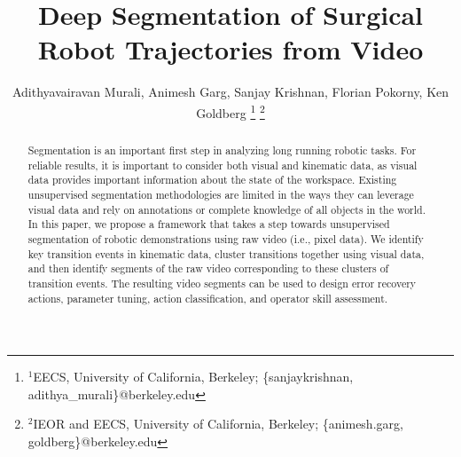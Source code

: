 \documentclass[letterpaper, 10 pt, conference]{ieeeconf}
\title{\LARGE \bf
Deep Segmentation of Surgical Robot Trajectories from Video 
}
\author{%
Adithyavairavan Murali, Animesh Garg, Sanjay Krishnan, Florian Pokorny, Ken Goldberg
\thanks{$^{1}$EECS, University of California, Berkeley; {\{sanjaykrishnan, adithya\_murali\}@berkeley.edu}}%
\thanks{$^{2}$IEOR and EECS, University of California, Berkeley; {\{animesh.garg, goldberg\}@berkeley.edu}}%
}
\begin{document}
\maketitle

\begin{abstract}
Segmentation is an important first step in analyzing long running robotic tasks. 
For reliable results, it is important to consider both visual and kinematic data, as visual data provides important information about the state of the workspace. 
Existing unsupervised segmentation methodologies are limited in the ways they can leverage visual data and rely on annotations or complete knowledge of all objects in the world. In this paper, we propose a framework that takes a step towards unsupervised segmentation of robotic demonstrations using raw video (i.e., pixel data). 
We identify key transition events in kinematic data, cluster transitions together using visual data, and then identify segments of the raw video corresponding to these clusters of transition events. 
The resulting video segments can be used to design error recovery actions, parameter tuning, action classification, 
and operator skill assessment. 
\end{abstract} 












\end{document}
